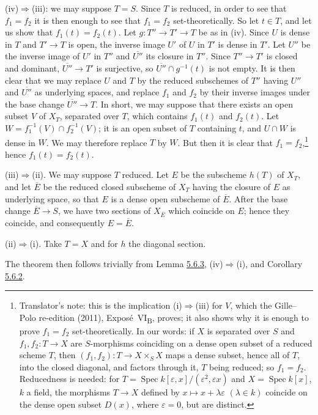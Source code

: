 \textup{(iv)}\(\Rightarrow\)\textup{(iii)}: we may suppose \(T=S\). Since \(T\) is reduced, in order to see that
\(f_1=f_2\) it is then enough to see that \(f_1=f_2\) set-theoretically. So let \(t\in T\), and let us show that
\(f_1(t)=f_2(t)\). Let \(g:T''\to T'\to T\) be as in \textup{(iv)}. Since \(U\) is dense in \(T\) and \(T'\to T\)
is open, the inverse image \(U'\) of \(U\) in \(T'\) is dense in \(T'\). Let \(U''\) be the inverse image of
\(U'\) in \(T''\) and \(\overline{U''}\) its closure in \(T''\). Since \(T''\to T'\) is closed and dominant,
\(\overline{U''}\to T'\) is surjective, so \(\overline{U''}\cap g^{-1}(t)\) is not empty. It is then clear that
we may replace \(U\) and \(T\) by the reduced subschemes of \(T''\) having \(U''\) and \(\overline{U''}\) as
underlying spaces, and replace \(f_1\) and \(f_2\) by their inverse images under the base change
\(\overline{U''}\to T\). In short, we may suppose that there exists an open subset \(V\) of \(X_T\), separated
over \(T\), which contains \(f_1(t)\) and \(f_2(t)\). Let \(W=f_1^{-1}(V)\cap f_2^{-1}(V)\); it is an open
subset of \(T\) containing \(t\), and \(U\cap W\) is dense in \(W\). We may therefore replace \(T\) by \(W\). But
then it is clear that \(f_1=f_2\),\footnote{Translator's note: this is the implication
(i)\(\Rightarrow\)(iii) for \(V\), which the Gille--Polo re-edition (2011), Expos\'e~VI\textsubscript{B}, proves;
it also shows why it is enough to prove \(f_1=f_2\) set-theoretically. In our words: if \(X\) is separated over
\(S\) and \(f_1,f_2\colon T\to X\) are \(S\)-morphisms coinciding on a dense open subset of a reduced scheme
\(T\), then \((f_1,f_2)\colon T\to X\times_SX\) maps a dense subset, hence all of \(T\), into the closed diagonal,
and factors through it, \(T\) being reduced; so \(f_1=f_2\). Reducedness is needed: for
\(T=\operatorname{Spec}k[\varepsilon,x]/(\varepsilon^2,\varepsilon x)\) and \(X=\operatorname{Spec}k[x]\), \(k\) a
field, the morphisms \(T\to X\) defined by \(x\mapsto x+\lambda\varepsilon\) \((\lambda\in k)\) coincide on the
dense open subset \(D(x)\), where \(\varepsilon=0\), but are distinct.} hence \(f_1(t)=f_2(t)\).

\textup{(iii)}\(\Rightarrow\)\textup{(ii)}. We may suppose \(T\) reduced. Let \(E\) be the subscheme \(h(T)\) of
\(X_T\), and let \(\overline E\) be the reduced closed subscheme of \(X_T\) having the closure of \(E\) as
underlying space, so that \(E\) is a dense open subscheme of \(\overline E\). After the base change
\(\overline E\to S\), we have two sections of \(X_{\overline E}\) which coincide on \(E\); hence they coincide,
and consequently \(E=\overline E\).

\textup{(ii)}\(\Rightarrow\)\textup{(i)}. Take \(T=X\) and for \(h\) the diagonal section.

The theorem then follows trivially from Lemma \hyperref[lem:sga3-VIB-5.6.3]{5.6.3},
\textup{(iv)}\(\Rightarrow\)\textup{(i)}, and Corollary \hyperref[cor:sga3-VIB-5.6.2]{5.6.2}.
